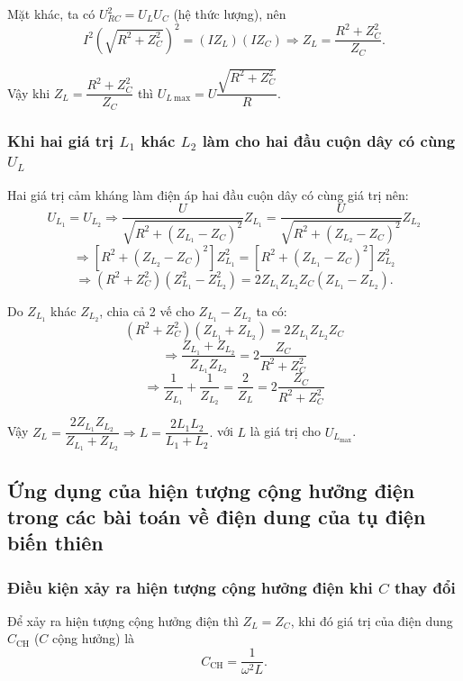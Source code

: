 Mặt khác, ta có $U_{RC}^2 = U_L U_C$ (hệ thức lượng), nên
\begin{equation*}
	I^2 \left(\sqrt {R^2 + Z_C^2}\right)^2 = (I Z_L) (I Z_C)\Rightarrow Z_L=\dfrac{R^2 + Z_C^2}{Z_C}.
\end{equation*}

Vậy khi $Z_L=\dfrac{R^2 + Z_C^2}{Z_C}$ thì $U_{L\ \text{max}}=U\dfrac{\sqrt{R^2 + Z_C^2}}{R}$.
\subsubsection{Khi hai giá trị $L_1$ khác $L_2$ làm cho hai đầu cuộn dây có cùng $U_L$}

Hai giá trị cảm kháng làm điện áp hai đầu cuộn dây có cùng giá trị nên:
$$U_{L_1}=U_{L_2} \Rightarrow \dfrac{U}{\sqrt{R^2+(Z_{L_1}-Z_C)^2}}Z_{L_1}=\dfrac{U}{\sqrt{R^2+(Z_{L_2}-Z_C)^2}}Z_{L_2}$$
$$\Rightarrow [R^2+(Z_{L_2}-Z_C)^2]Z^2_{L_1} = [R^2+(Z_{L_1}-Z_C)^2]Z^2_{L_2}$$
$$\Rightarrow (R^2+Z_C^2)(Z^2_{L_1} - Z^2_{L_2})=2Z_{L_1}Z_{L_2} Z_C (Z_{L_1}- Z_{L_2}).$$

Do $Z_{L_1}$ khác $Z_{L_2}$, chia cả 2 vế cho $Z_{L_1}-Z_{L_2}$ ta có:
$$(R^2+Z_C^2)(Z_{L_1}+Z_{L_2})=2Z_{L_1}Z_{L_2} Z_C$$
$$\Rightarrow \dfrac{Z_{L_1}+Z_{L_2}}{Z_{L_1}Z_{L_2}} = 2 \dfrac{Z_C}{R^2+Z_C^2}$$
$$\Rightarrow \dfrac{1}{Z_{L_1}} + \dfrac{1}{Z_{L_2}}  = \dfrac{2}{Z_{L}} =2 \dfrac{Z_C}{R^2+Z_C^2}$$

Vậy $Z_L = \dfrac{2Z_{L_1}Z_{L_2}}{Z_{L_1}+Z_{L_2}} \Rightarrow L = \dfrac{2L_1L_2}{L_1+L_2}.$ với $L$ là giá trị cho $U_{L_\text{max}}$.
\subsection{Ứng dụng của hiện tượng cộng hưởng điện trong các bài toán về điện dung của tụ điện biến thiên}
\subsubsection{Điều kiện xảy ra hiện tượng cộng hưởng điện khi $C$ thay đổi}
Để xảy ra hiện tượng cộng hưởng điện thì $Z_L = Z_C$, khi đó giá trị của điện dung $C_\text{CH}$ ($C$ cộng hưởng) là
\begin{equation*}
	C_\text{CH}=\dfrac{1}{\omega ^2 L}.
\end{equation*}
